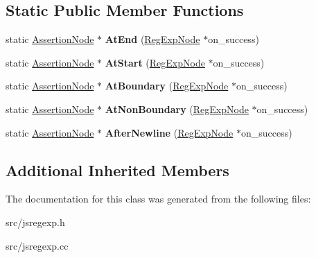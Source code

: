 \subsection*{Static Public Member Functions}
\begin{DoxyCompactItemize}
\item 
\hypertarget{classv8_1_1internal_1_1_assertion_node_a7663a6a9a51975492c0bfe7b5a61a832}{}static \hyperlink{classv8_1_1internal_1_1_assertion_node}{Assertion\+Node} $\ast$ {\bfseries At\+End} (\hyperlink{classv8_1_1internal_1_1_reg_exp_node}{Reg\+Exp\+Node} $\ast$on\+\_\+success)\label{classv8_1_1internal_1_1_assertion_node_a7663a6a9a51975492c0bfe7b5a61a832}

\item 
\hypertarget{classv8_1_1internal_1_1_assertion_node_ac3c21366bba17cf86759c0cdea7ae035}{}static \hyperlink{classv8_1_1internal_1_1_assertion_node}{Assertion\+Node} $\ast$ {\bfseries At\+Start} (\hyperlink{classv8_1_1internal_1_1_reg_exp_node}{Reg\+Exp\+Node} $\ast$on\+\_\+success)\label{classv8_1_1internal_1_1_assertion_node_ac3c21366bba17cf86759c0cdea7ae035}

\item 
\hypertarget{classv8_1_1internal_1_1_assertion_node_ac281096ab369662a023267aac4117bfd}{}static \hyperlink{classv8_1_1internal_1_1_assertion_node}{Assertion\+Node} $\ast$ {\bfseries At\+Boundary} (\hyperlink{classv8_1_1internal_1_1_reg_exp_node}{Reg\+Exp\+Node} $\ast$on\+\_\+success)\label{classv8_1_1internal_1_1_assertion_node_ac281096ab369662a023267aac4117bfd}

\item 
\hypertarget{classv8_1_1internal_1_1_assertion_node_ad6d20cd648da9b791ca9f35367f2470e}{}static \hyperlink{classv8_1_1internal_1_1_assertion_node}{Assertion\+Node} $\ast$ {\bfseries At\+Non\+Boundary} (\hyperlink{classv8_1_1internal_1_1_reg_exp_node}{Reg\+Exp\+Node} $\ast$on\+\_\+success)\label{classv8_1_1internal_1_1_assertion_node_ad6d20cd648da9b791ca9f35367f2470e}

\item 
\hypertarget{classv8_1_1internal_1_1_assertion_node_aa84ccd02ac323be278e3cb07633793b0}{}static \hyperlink{classv8_1_1internal_1_1_assertion_node}{Assertion\+Node} $\ast$ {\bfseries After\+Newline} (\hyperlink{classv8_1_1internal_1_1_reg_exp_node}{Reg\+Exp\+Node} $\ast$on\+\_\+success)\label{classv8_1_1internal_1_1_assertion_node_aa84ccd02ac323be278e3cb07633793b0}

\end{DoxyCompactItemize}
\subsection*{Additional Inherited Members}


The documentation for this class was generated from the following files\+:\begin{DoxyCompactItemize}
\item 
src/jsregexp.\+h\item 
src/jsregexp.\+cc\end{DoxyCompactItemize}
